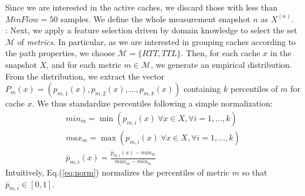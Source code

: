 \documentclass{acm_proc_article-sp}
\begin{document}
Since we are interested in the active caches, we discard those with less than $MinFlow=50$ samples.
We define the whole measurement snapshot $n$ as $X^{(n)}$.\\
:
Next, we apply a feature selection driven by domain knowledge to select the set $\mathcal{M}$ of {\it metrics}. In particular, as we are interested in grouping caches according to the path properties, we choose $\mathcal{M}=\{RTT, TTL\}$. Then, for each cache $x$ in the snapshot $X$, and for each metric $m\in \mathcal{M}$, we generate an empirical distribution.
From the distribution, we extract the vector $P_m(x)=\left(p_{m,1}(x),p_{m,2}(x),\ldots,p_{m,k}(x)\right)$ containing $k$ percentiles of $m$ for cache $x$.
We thus standardize percentiles following a simple normalization:
\begin{eqnarray}
	min_m = \min\left(p_{m,i}(x) \ \forall x \in X,  \forall i=1, \ldots, k\right) \\
	max_m = \max\left(p_{m,i}(x) \ \forall x \in X,  \forall i=1, \ldots, k\right) \\
	\bar{p}_{m,i}(x) = \frac{p_{m,i}(x) - min_m}{max_m - min_m} \label{eq:norm}
\end{eqnarray}
Intuitively, Eq.(\ref{eq:norm}) normalizes the percentiles of metric $m$ so that $\bar{p}_{m,i} \in [0,1]$.
\end{document}
